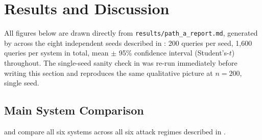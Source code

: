 \section{Results and Discussion}
\label{sec:results}

All figures below are drawn directly from \texttt{results/path\allowbreak\_a\allowbreak\_report.md},
generated by  across the eight independent
seeds described in : 200 queries per seed, 1{,}600 queries
per system in total, mean $\pm$ 95\% confidence interval (Student's-$t$)
throughout. The single-seed sanity check in 
was re-run immediately before writing this section and reproduces the same
qualitative picture at $n{=}200$, single seed.

\subsection{Main System Comparison}

 and  compare all six
systems across all six attack regimes described in .

\begin{table}[htbp]
\centering
\small
{}
\caption{Main system comparison --- 8 seeds, 1{,}600 queries/system, mean $\pm$ 95\% CI.}
\label{tab:main-comparison}
\end{table}

